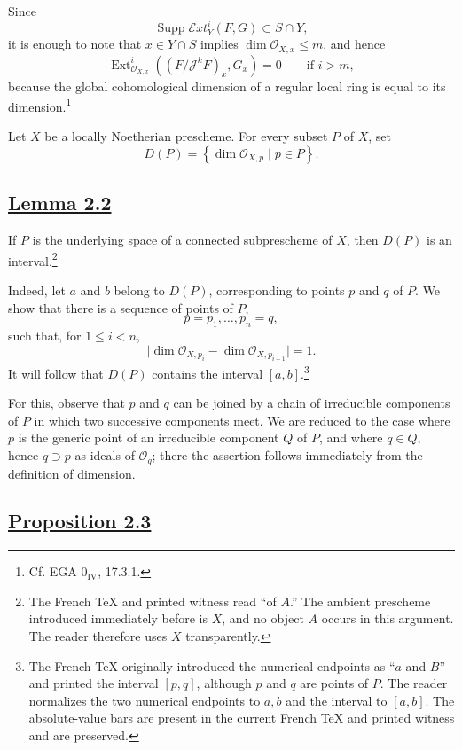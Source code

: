 \documentclass[11pt,a4paper,oneside]{book}
\providecommand{\Jj}{\mathcal J}
\providecommand{\Oo}{\mathcal O}
\providecommand{\SheafExt}{\mathcal E\!xt}
\providecommand{\Supp}{\operatorname{Supp}}
\providecommand{\Extop}{\operatorname{Ext}}
\theoremstyle{plain}
\theoremstyle{definition}
\theoremstyle{remark}
\begin{document}
Since
\[
  \Supp\SheafExt_Y^i(F,G)\subset S\cap Y,
\]
it is enough to note that $x\in Y\cap S$ implies
$\dim\Oo_{X,x}\leq m$, and hence
\[
  \Extop^i_{\Oo_{X,x}}((F/\Jj^kF)_x,G_x)=0
  \qquad\text{if }i>m,
\]
because the global cohomological dimension of a regular local ring is equal
to its dimension.\footnote{Cf. EGA $0_{\mathrm{IV}}$, 17.3.1.}

Let $X$ be a locally Noetherian prescheme. For every subset $P$ of $X$, set
\[
  D(P)=\left\{\dim\Oo_{X,p}\mid p\in P\right\}.
\]

\subsection*{\hyperref[VII.2.2]{Lemma 2.2}}

If $P$ is the underlying space of a connected subprescheme of $X$, then
$D(P)$ is an interval.\footnote{The French TeX and printed witness read
``of $A$.'' The ambient prescheme introduced immediately before is $X$, and
no object $A$ occurs in this argument. The reader therefore uses $X$
transparently.}

Indeed, let $a$ and $b$ belong to $D(P)$, corresponding to points $p$ and $q$
of $P$. We show that there is a sequence of points of $P$,
\[
  p=p_1,\ldots,p_n=q,
\]
such that, for $1\leq i<n$,
\[
  \lvert\dim\Oo_{X,p_i}-\dim\Oo_{X,p_{i+1}}\rvert=1.
\]
It will follow that $D(P)$ contains the interval $[a,b]$.\footnote{The French
TeX originally introduced the numerical endpoints as ``$a$ and $B$''
and printed the interval $[p,q]$, although $p$ and $q$ are points of $P$.
The reader normalizes the two numerical endpoints to $a,b$ and the interval to
$[a,b]$. The absolute-value bars are present in the current French TeX and
printed witness and are preserved.}

For this, observe that $p$ and $q$ can be joined by a chain of irreducible
components of $P$ in which two successive components meet. We are reduced to
the case where $p$ is the generic point of an irreducible component $Q$ of
$P$, and where $q\in Q$, hence $q\supset p$ as ideals of $\Oo_q$; there the
assertion follows immediately from the definition of dimension.

\clearpage
\subsection*{\hyperref[VII.2.3]{Proposition 2.3}}
\end{document}

